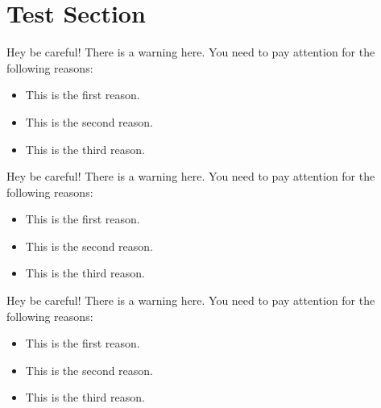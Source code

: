 \documentclass[../main.tex]{subfiles}
\begin{document}
\section{Test Section}

\blindtext

\begin{testwarning2}
Hey be careful!
There is a warning here. You need to pay attention for the following reasons:
\begin{itemize}
  \item This is the first reason.
  \item This is the second reason.
  \item This is the third reason.
\end{itemize}
\end{testwarning2}

\begin{testwarning2}
Hey be careful!
There is a warning here. You need to pay attention for the following reasons:
\begin{itemize}
  \item This is the first reason.
  \item This is the second reason.
  \item This is the third reason.
\end{itemize}
\end{testwarning2}

\begin{testwarning2}
Hey be careful!
There is a warning here. You need to pay attention for the following reasons:
\begin{itemize}
  \item This is the first reason.
  \item This is the second reason.
  \item This is the third reason.
\end{itemize}
\end{testwarning2}

\blindtext

\begin{testbox2}
	\blindtext
\end{testbox2}

\blindtext

\begin{testbox4}
	\blindtext
\end{testbox4}
\end{document}
